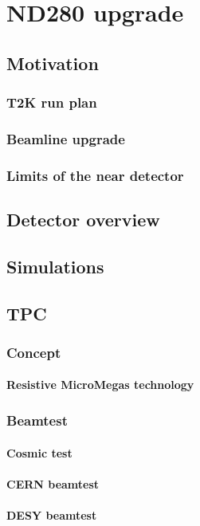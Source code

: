 \documentclass[../main.tex]{subfiles}
\begin{document}
\part{ND280 upgrade}

\chapter{Motivation}
\section{T2K run plan}
\section{Beamline upgrade}
\section{Limits of the near detector}
\chapter{Detector overview}
\chapter{Simulations}

\chapter{TPC}
\section{Concept}
\subsection{Resistive MicroMegas technology}
\section{Beamtest}
\subsection{Cosmic test}
\subsection{CERN beamtest}
\subsection{DESY beamtest}
\end{document}
